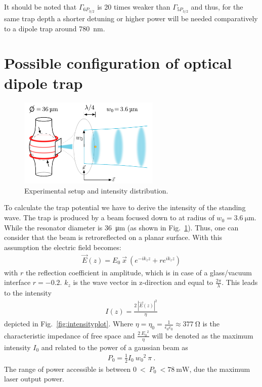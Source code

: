 It should be noted that \(\Gamma_{6P_{3/2}}\) is 20 times weaker than 
\(\Gamma_{5P_{3/2}}\) and thus, for the same trap depth a shorter detuning or 
higher power will be needed comparatively to a dipole trap around \SI{780}{\nano\meter}.

\section{Possible configuration of optical dipole trap} %

\begin{figure}[h]
    \centering
    \includegraphics[width=0.6\textwidth]{resonator_trap_label}
    \caption{\label{fig:resonator_trap_label} Experimental setup and intensity 
    distribution. }
\end{figure}
To calculate the trap potential we have to derive the intensity of the standing
wave. The trap is produced by a beam focused down to at radius of \(w_0 = 
\SI{3.6}{\micro\meter} \). While the resonator diameter is \SI{36}{\micro\meter}
(as shown in Fig.~\ref{fig:resonator_trap_label}). Thus, one can consider that
the beam is retroreflected on a planar surface. With this assumption the electric 
field becomes:
\begin{align}
    \vec{E}(z) = E_0~\vec{x}~\left( e^{-i k_z z} + r e^{i k_z z} \right)
\end{align}
with \(r \) the reflection coefficient in amplitude, which is in case of a 
glass/vacuum interface \(r = -0.2 \). \(k_z \) is the wave vector in z-direction 
and equal to \(\frac{2\pi}{\lambda} \). This leads to the intensity
\begin{align}
    I(z) = \frac{ { 2~| \vec{E}(z) | }^2}{\eta}
\end{align}
depicted in Fig.~\ref{fig:intensityplot}. Where 
\(\eta = \eta_0 = \frac{1}{\epsilon_0 c_0} \approx \SI{377}{\ohm} \) is the 
characteristic impedance of free space and \(\frac{2~{E_0}^2}{\eta} \) will be 
denoted as the maximum intensity \(I_0 \) and related to the power of a gaussian 
beam as
\begin{align}
    P_0 = \frac{1}{2} I_0~ {w_0}^2~\pi~.
\end{align} 
The range of power accessible is between \(0~<~P_0~<\SI{78}{\milli\watt} \), due
the maximum laser output power. 

